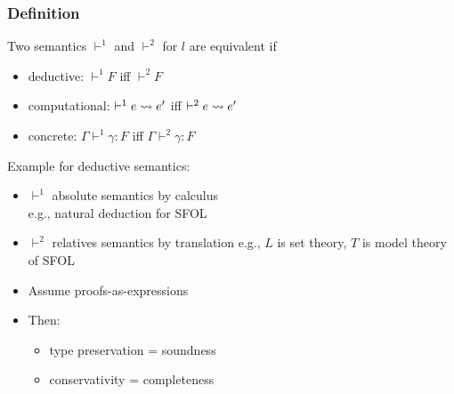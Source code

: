 \begin{frame}\frametitle{Definition}
Two semantics $\vdash^1$ and $\vdash^2$ for $l$ are equivalent if
\begin{itemize}
\item deductive: $\vdash^1 F$ iff $\vdash^2 F$
\item computational: $\vdash^1 e\rightsquigarrow e'$ iff $\vdash^2 e\rightsquigarrow e'$
\item concrete: $\Gamma\vdash^1 \gamma:F$ iff $\Gamma\vdash^2 \gamma:F$
\end{itemize}

Example for deductive semantics:
\begin{itemize}
\item $\vdash^1$ absolute semantics by calculus \\
 e.g., natural deduction for SFOL
\item $\vdash^2$ relatives semantics by translation
 e.g., $L$ is set theory, $T$ is model theory of SFOL
\item Assume proofs-as-expressions
\item Then:
 \begin{itemize}
 \item type preservation = soundness
 \item conservativity = completeness
 \end{itemize}
\end{itemize}
\end{frame}


